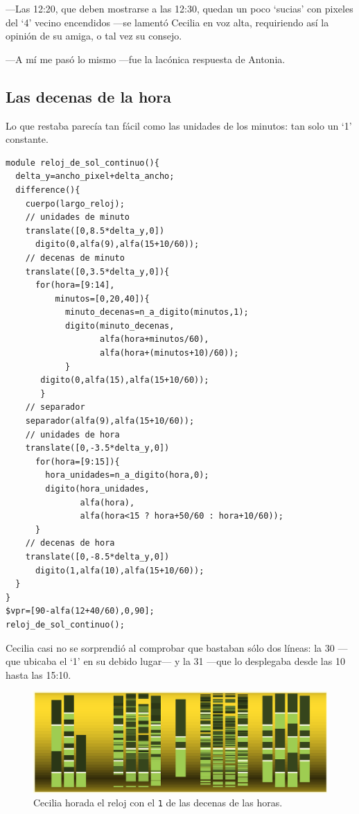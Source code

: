 ---Las 12:20, que deben mostrarse a las 12:30, quedan un poco `sucias'
con pixeles del `4' vecino encendidos ---se lamentó Cecilia en voz
alta, requiriendo así la opinión de su amiga, o tal vez su consejo.

---A mí me pasó lo mismo ---fue la lacónica respuesta de Antonia.

\subsection{Las decenas de la hora}

Lo que restaba parecía tan fácil como las unidades de los minutos: tan
solo un `1' constante.

\begin{lstlisting}
module reloj_de_sol_continuo(){
  delta_y=ancho_pixel+delta_ancho;
  difference(){
    cuerpo(largo_reloj);    
    // unidades de minuto
    translate([0,8.5*delta_y,0])
      digito(0,alfa(9),alfa(15+10/60));  
    // decenas de minuto
    translate([0,3.5*delta_y,0]){
      for(hora=[9:14],
          minutos=[0,20,40]){
            minuto_decenas=n_a_digito(minutos,1);
            digito(minuto_decenas,
                   alfa(hora+minutos/60),
                   alfa(hora+(minutos+10)/60));
            }
       digito(0,alfa(15),alfa(15+10/60));
       }            
    // separador
    separador(alfa(9),alfa(15+10/60));  
    // unidades de hora
    translate([0,-3.5*delta_y,0])
      for(hora=[9:15]){
        hora_unidades=n_a_digito(hora,0);
        digito(hora_unidades,
               alfa(hora),
               alfa(hora<15 ? hora+50/60 : hora+10/60));
      }        
    // decenas de hora
    translate([0,-8.5*delta_y,0])
      digito(1,alfa(10),alfa(15+10/60));    
  }  
}  
$vpr=[90-alfa(12+40/60),0,90];
reloj_de_sol_continuo();
\end{lstlisting}%

Cecilia casi no se sorprendió al comprobar que bastaban sólo dos
líneas: la 30 ---que ubicaba el `1' en su debido lu\-gar--- y la 31
---que lo desplegaba desde las 10 hasta las 15:10.


\begin{figure}[ht]
  \centering
  \includegraphics[width=\textwidth]{imagenes/horas-decenas-1}  
  \caption{Cecilia horada el reloj con el \texttt{1} de las decenas de las
    horas.}
  \label{fig:horas-decenas-1}
\end{figure}


